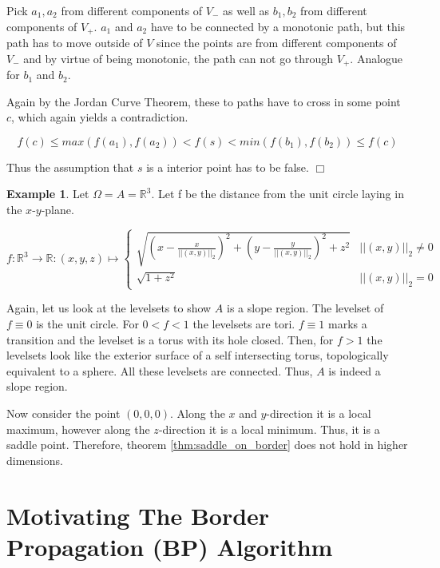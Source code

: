 \documentclass[a4paper,10pt,notitlepage,fullpage]{paper}
\theoremstyle{plain}
\theoremstyle{definition}
\newtheorem{exmp}[thm]{Example} %
\begin{document}
Pick $a_1, a_2$ from different components of $V_-$ as well as $b_1, b_2$ from different components of $V_+$.
$a_1$ and $a_2$ have to be connected by a monotonic path, but this path has to move outside of $V$ since the points are from different components of $V_-$ and by virtue of being monotonic, the path can not go through $V_+$.
Analogue for $b_1$ and $b_2$.

Again by the Jordan Curve Theorem, these to paths have to cross in some point $c$, which again yields a contradiction.

\begin{equation*}
f(c) \leq max(f(a_1), f(a_2)) < f(s) < min(f(b_1), f(b_2)) \leq f(c)
\end{equation*}

Thus the assumption that $s$ is a interior point has to be false.
\hfill $\Box$

\begin{exmp}
Let $\Omega = A = \mathbb R^3$.
Let f be the distance from the unit circle laying in the $x$-$y$-plane. 

\begin{equation*}
f: \mathbb R^3 \to \mathbb R: (x,y,z) \mapsto 
\begin{cases}
\sqrt{\left(x - \frac{x}{||\left(x,y\right)||_2}\right)^2 + \left(y - \frac{y}{||\left(x,y\right)||_2}\right)^2 + z^2} & ||(x,y)||_2 \neq 0 \\
\sqrt{1+z^2} & ||(x,y)||_2 = 0
\end{cases}
\end{equation*}

Again, let us look at the levelsets to show $A$ is a slope region.
The levelset of $f \equiv 0$ is the unit circle. For $0 < f < 1$ the levelsets are tori.
$f \equiv 1$ marks a transition and the levelset is a torus with its hole closed.
Then, for $f > 1$ the levelsets look like the exterior surface of a self intersecting torus, topologically equivalent to a sphere.
All these levelsets are connected.
Thus, $A$ is indeed a slope region.

Now consider the point $(0,0,0)$.
Along the $x$ and $y$-direction it is a local maximum, however along the $z$-direction it is a local minimum.
Thus, it is a saddle point.
Therefore, theorem \ref{thm:saddle_on_border} does not hold in higher dimensions.
\end{exmp}


\section{Motivating The Border Propagation (BP) Algorithm}
\label{sec:motivating_BP}
\end{document}
